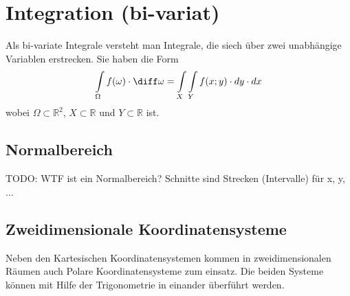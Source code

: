 \newpage
\section{Integration (bi-variat)}
Als bi-variate Integrale versteht man Integrale, die siech über zwei unabhängige Variablen erstrecken.
Sie haben die Form
\[
    \int\limits_{\Omega} f(\omega)\cdot \diff \omega =\int\limits_{X} \int\limits_{Y} f(x;y) \cdot dy \cdot dx
\]
wobei $ \Omega \subset \mathbb{R}^2 $, $ X \subset \mathbb{R} $ und $ Y \subset \mathbb{R} $ ist.

\subsection{Normalbereich}

TODO: WTF ist ein Normalbereich?
Schnitte sind Strecken (Intervalle) für x, y, ...

\subsection{Zweidimensionale Koordinatensysteme}
Neben den Kartesischen Koordinatensystemen kommen in zweidimensionalen Räumen auch Polare Koordinatensysteme zum einsatz.
Die beiden Systeme können mit Hilfe der Trigonometrie in einander überführt werden.

